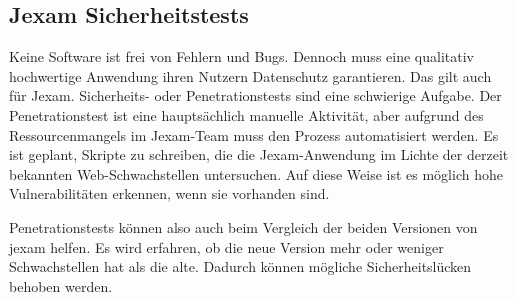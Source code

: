 \subsection{Jexam Sicherheitstests}

Keine Software ist frei von Fehlern und Bugs. Dennoch muss eine qualitativ
hochwertige Anwendung ihren Nutzern Datenschutz garantieren. Das gilt
auch f\"ur Jexam. Sicherheits- oder Penetrationstests sind eine schwierige
Aufgabe. Der Penetrationstest ist eine haupts\"achlich manuelle Aktivit\"at,
aber aufgrund des Ressourcenmangels im Jexam-Team muss den Prozess
automatisiert werden. Es ist geplant, Skripte zu schreiben, die die
Jexam-Anwendung im Lichte der derzeit bekannten Web-Schwachstellen
untersuchen. Auf diese Weise ist es m\"oglich hohe Vulnerabilit\"aten
erkennen, wenn sie vorhanden sind.


Penetrationstests k\"onnen also auch beim Vergleich der beiden Versionen von
jexam helfen. Es wird erfahren, ob die neue Version mehr oder weniger
Schwachstellen hat als die alte. Dadurch k\"onnen m\"ogliche
Sicherheitsl\"ucken behoben werden.


